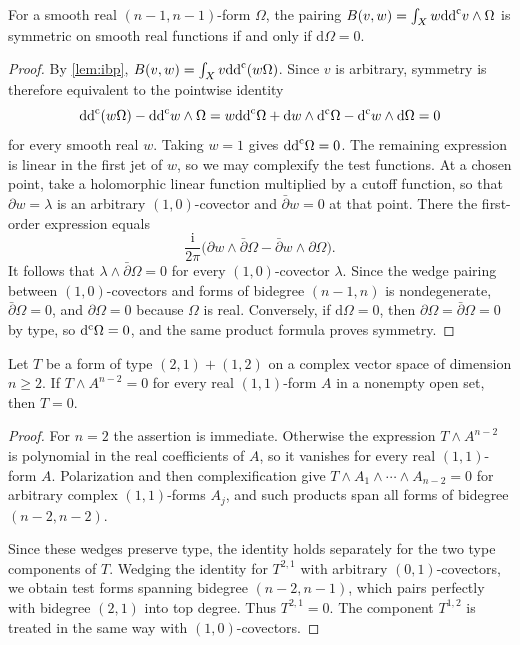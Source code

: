 \begin{lemma}\label{lem:formal-symmetry}
For a smooth real $(n-1,n-1)$-form $\Omega$, the pairing
$B(v,w)=\int_Xw\mathrm{dd}^{\mathrm{c}} v\wedge\Omega$ is symmetric on smooth real functions if and only if $\mathrm{d}\Omega=0$.
\end{lemma}
\begin{proof}
By \cref{lem:ibp}, $B(v,w)=\int_Xv\mathrm{dd}^{\mathrm{c}}(w\Omega)$. Since $v$ is arbitrary, symmetry is therefore equivalent to the pointwise identity
\[
 \mathrm{dd}^{\mathrm{c}}(w\Omega)-\mathrm{dd}^{\mathrm{c}} w\wedge\Omega
 =w\mathrm{dd}^{\mathrm{c}}\Omega+\mathrm{d}w\wedge\mathrm d^{\mathrm c}\Omega-\mathrm d^{\mathrm c} w\wedge \mathrm{d}\Omega=0
\]
for every smooth real $w$. Taking $w=1$ gives $\mathrm{dd}^{\mathrm{c}}\Omega=0$. The remaining expression is linear in the first jet of $w$, so we may complexify the test functions. At a chosen point, take a holomorphic linear function multiplied by a cutoff function, so that $\partial w=\lambda$ is an arbitrary $(1,0)$-covector and $\bar\partial w=0$ at that point. There the first-order expression equals
\[
 \frac{\mathrm i}{2\pi}\bigl(\partial w\wedge\bar\partial\Omega
             -\bar\partial w\wedge\partial\Omega\bigr).
\]
It follows that $\lambda\wedge\bar\partial\Omega=0$ for every $(1,0)$-covector $\lambda$. Since the wedge pairing between $(1,0)$-covectors and forms of bidegree $(n-1,n)$ is nondegenerate, $\bar\partial\Omega=0$, and $\partial\Omega=0$ because $\Omega$ is real. Conversely, if $\mathrm{d}\Omega=0$, then $\partial\Omega=\bar\partial\Omega=0$ by type, so $\mathrm d^{\mathrm c}\Omega=0$, and the same product formula proves symmetry.
\end{proof}

\begin{lemma}\label{lem:torsion-polarization}
Let $T$ be a form of type $(2,1)+(1,2)$ on a complex vector space of dimension $n\geq2$. If $T\wedge A^{n-2}=0$ for every real $(1,1)$-form $A$ in a nonempty open set, then $T=0$.
\end{lemma}
\begin{proof}
For $n=2$ the assertion is immediate. Otherwise the expression $T\wedge A^{n-2}$ is polynomial in the real coefficients of $A$, so it vanishes for every real $(1,1)$-form $A$. Polarization and then complexification give
$T\wedge A_1\wedge\cdots\wedge A_{n-2}=0$ for arbitrary complex $(1,1)$-forms $A_j$, and such products span all forms of bidegree $(n-2,n-2)$.

Since these wedges preserve type, the identity holds separately for the two type components of $T$. Wedging the identity for $T^{2,1}$ with arbitrary $(0,1)$-covectors, we obtain test forms spanning bidegree $(n-2,n-1)$, which pairs perfectly with bidegree $(2,1)$ into top degree. Thus $T^{2,1}=0$. The component $T^{1,2}$ is treated in the same way with $(1,0)$-covectors.
\end{proof}

